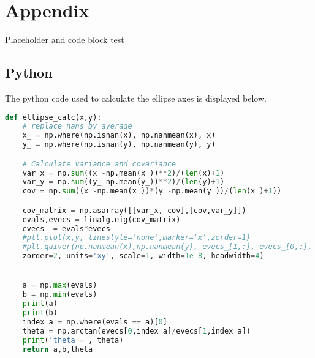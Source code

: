 \section{Appendix}
Placeholder and code block test
\subsection{Python}
The python code used to calculate the ellipse axes is displayed below.
\begin{lstlisting}[language=Python]
def ellipse_calc(x,y):
    # replace nans by average
    x_ = np.where(np.isnan(x), np.nanmean(x), x)
    y_ = np.where(np.isnan(y), np.nanmean(y), y)

    # Calculate variance and covariance
    var_x = np.sum((x_-np.mean(x_))**2)/(len(x)+1)
    var_y = np.sum((y_-np.mean(y_))**2)/(len(y)+1)
    cov = np.sum((x_-np.mean(x_))*(y_-np.mean(y_))/(len(x_)+1))

    cov_matrix = np.asarray([[var_x, cov],[cov,var_y]])
    evals,evecs = linalg.eig(cov_matrix)
    evecs_ = evals*evecs
    #plt.plot(x,y, linestyle='none',marker='x',zorder=1)
    #plt.quiver(np.nanmean(x),np.nanmean(y),-evecs_[1,:],-evecs_[0,:],
    zorder=2, units='xy', scale=1, width=1e-8, headwidth=4)


    a = np.max(evals)
    b = np.min(evals)
    print(a)
    print(b)
    index_a = np.where(evals == a)[0]
    theta = np.arctan(evecs[0,index_a]/evecs[1,index_a])
    print('theta =', theta)
    return a,b,theta
\end{lstlisting}







